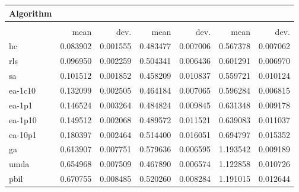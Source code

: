 \begin{tabular}{@{} l *{6}{>{{}}N{1}{2}} @{}}
\toprule
{Algorithm} &  \\
\midrule
&  &  &  \\
\midrule
& {mean} & {dev.} & {mean} & {dev.} & {mean} & {dev.} \\
\midrule
hc & 0.083902 & 0.001555 & 0.483477 & 0.007006 & 0.567378 & 0.007062 \\
rls & 0.096950 & 0.002259 & 0.504341 & 0.006436 & 0.601291 & 0.006970 \\
sa & 0.101512 & 0.001852 & 0.458209 & 0.010837 & 0.559721 & 0.010124 \\
ea-1c10 & 0.132099 & 0.002505 & 0.464184 & 0.007065 & 0.596284 & 0.006815 \\
ea-1p1 & 0.146524 & 0.003264 & 0.484824 & 0.009845 & 0.631348 & 0.009178 \\
ea-1p10 & 0.149512 & 0.002068 & 0.489572 & 0.011521 & 0.639083 & 0.011037 \\
ea-10p1 & 0.180397 & 0.002464 & 0.514400 & 0.016051 & 0.694797 & 0.015352 \\
ga & 0.613907 & 0.007751 & 0.579636 & 0.006595 & 1.193542 & 0.009189 \\
umda & 0.654968 & 0.007509 & 0.467890 & 0.006574 & 1.122858 & 0.010726 \\
pbil & 0.670755 & 0.008485 & 0.520260 & 0.008284 & 1.191015 & 0.012644 \\
\bottomrule
\end{tabular}
